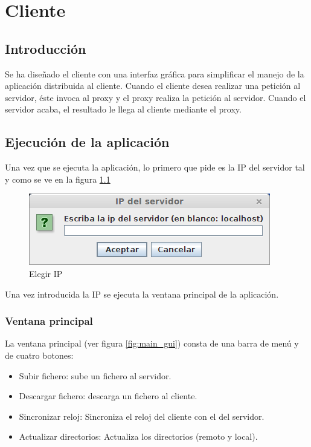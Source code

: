 \chapter{Cliente}
\section{Introducción}
Se ha diseñado el cliente con una interfaz gráfica para simplificar el manejo de la aplicación distribuida al cliente. Cuando el cliente desea realizar una petición al servidor, éste invoca al proxy y el proxy realiza la petición al servidor. Cuando el servidor acaba, el resultado le llega al cliente mediante el proxy.

\section{Ejecución de la aplicación}
Una vez que se ejecuta la aplicación, lo primero que pide es la IP del servidor tal y como se ve en la figura \ref{fig:elegir_ip}
\begin{figure}[htb]
	\centering
	\includegraphics[scale=1]{imagenes/elegir_ip.png}
	\caption{Elegir IP}
	\label{fig:elegir_ip}
\end{figure}
Una vez introducida la IP se ejecuta la ventana principal de la aplicación.

\subsection{Ventana principal}
La ventana principal (ver figura \ref{fig:main_gui}) consta de una barra de menú y de cuatro botones:
\begin{itemize}
	\item Subir fichero: sube un fichero al servidor.
	\item Descargar fichero: descarga un fichero al cliente.
	\item Sincronizar reloj: Sincroniza el reloj del cliente con el del servidor.
	\item Actualizar directorios: Actualiza los directorios (remoto y local).
\end{itemize}

